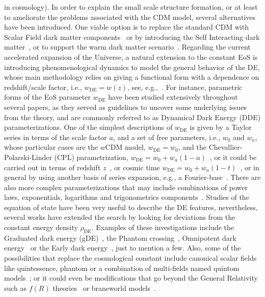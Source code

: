 \documentclass[twocolumn,a4paper,reprint,amssymb,aps,prd,groupedaddress,superscriptaddress,nofootinbib]{revtex4-2}
\begin{document}
in cosmology).
%
%
In order to explain the small scale structure formation, or at least to ameliorate the problems associated
with the CDM model, several alternatives have been introduced. One viable option
is to replace the standard CDM with Scalar Field dark matter components~\cite{ideas1,ideas2,ideas4,
Matos09, Tellez-Tovar:2021mge, Navarro-Boullosa:2023bya} or by introducing the Self Interacting dark matter~\cite{sidm,
Gonzalez:2008wa, Padilla:2019fju}, or to support the warm dark matter scenario~\cite{Pan:2022qrr,Naidoo:2022rda}.
%
Regarding the current accelerated expansion of the Universe, a natural extension to the constant EoS is
introducing phenomenological dynamics to model the general behavior of the DE, whose main
methodology relies on giving a functional form with a dependence on redshift/scale factor, i.e., $w_{\mathrm{DE}}=w(z)$,
see, e.g.,~\cite{AlbertoVazquez:2012ofj, DiValentino:2017zyq, Hee:2016nho, Zhao:2017cud, Wang:2018fng}.
For instance, parametric forms of the EoS parameter $w_{\mathrm{DE}}$ have been studied extensively throughout
several papers, as they served as guidelines to uncover some underlying issues from the theory, and are commonly
referred to as Dynamical Dark Energy (DDE) parameterizations. One of the simplest descriptions of $w_{\mathrm{DE}}$
is given by a Taylor series in terms of the scale factor $a$, and a set of free parameters, i.e., $w_0$ and $w_a$, whose particular
cases are the $w$CDM model, $w_{\mathrm{DE}} = w_0$, and the Chevallier-Polarski-Linder (CPL) parametrization,
$w_{\mathrm{DE}} = w_0 + w_a\left(1-a\right)$~\cite{Chevallier, Linder:2002et,CPL1, CPL2, 2012comprehensive}, or
it could be carried out in terms of redshift $z$~\cite{Zhang:2011xx}, or cosmic time $w_{\mathrm{DE}} = w_0 +
w_a(1-t)$~\cite{Akarsu:2015yea}, or in general by using another basis of series expansion, e.g., a
Fourier-base~\cite{Tamayo:2019gqj}. There are also more complex parameterizations that may include combinations
of power laws, exponentials, logarithms and trigonometrics components~\cite{Linder:2005dw, Kurek:2007bu,
Sahni:2006pa, Arciniega:2021ffa, Jaime:2018ftn,Yang:2021flj}.
%
Studies of the equation of state have been very useful to describe the DE features, nevertheless, several works
have extended the search by looking for deviations from the constant energy density $\rho_{\mathrm{DE}}$.
%
Examples of these investigations include the Graduated dark energy (gDE)~\cite{Akarsu:2019hmw, Acquaviva:2021jov, Akarsu:2021fol, Akarsu:2022typ, Akarsu:2023mfb},
the Phantom crossing~\cite{DiValentino:2020naf}, Omnipotent dark energy~\cite{Adil:2023exv} or the Early dark energy~\cite{Doran:2006kp}, just
to mention a few.
Also, some of the possibilities that replace the cosmological constant include canonical scalar fields
like quintessence, phantom or a combination of multi-fields named quintom models~\cite{Vazquez:2023kyx, Caldwell:1999ew,
Caldwell:2005tm, Vazquez:2020ani, Akarsu:2020pka, quintessence, modelsDE, quintom}; or it could even be
modifications that go beyond the General Relativity such as $f(R)$ theories~\cite{Felice100,Nojiri:2010wj}
or braneworld models~\cite{Ida:1999ui, Brax:2004xh, modifiedgravity, Miguel18}.
%
\end{document}
